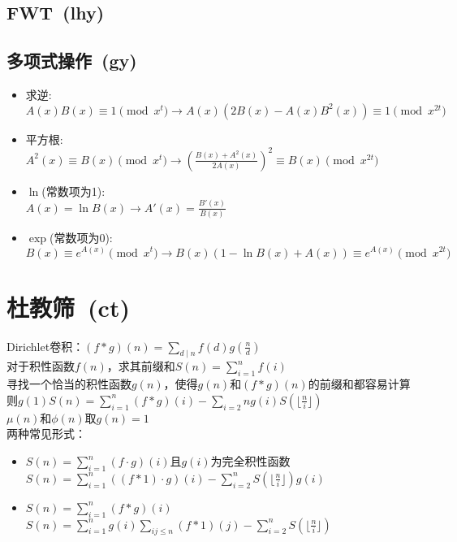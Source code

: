     \subsection*{FWT\ \small(lhy)}
    \subsection*{多项式操作\ \small(gy)}
        \begin{itemize}[wide=0pt]
            \item 求逆:
            \\$ A(x) B(x) \equiv 1 \pmod{x^t} \to A(x) (2B(x) - A(x) B^2(x)) \equiv 1 \pmod{x^{2t}} $
            \item 平方根:
            \\$ A^2(x) \equiv B(x) \pmod{x^t} \to (\frac{B(x) + A^2(x)}{2A(x)})^2 \equiv B(x) \pmod{x^{2t}} $
            \item $ \ln $(常数项为1):
            \\$ A(x) = \ln B(x) \to A'(x) = \frac{B'(x)}{B(x)} $
            \item $ \exp $(常数项为0):
            \\$ B(x) \equiv e^{A(x)} \pmod{x^t} \to B(x) (1 - \ln B(x) + A(x)) \equiv e^{A(x)} \pmod{x^{2t}} $
        \end{itemize}
\section{杜教筛\ \small(ct)}
    \noindent Dirichlet卷积：$ (f \ast g) (n) = \sum\limits_{d \mid n}^{} f(d) g(\frac{n}{d}) $
    \\对于积性函数$ f(n) $，求其前缀和$ S(n) = \sum\limits_{i = 1}^{n} f(i) $
    \\寻找一个恰当的积性函数$ g(n) $，使得$ g(n) $和$ (f \ast g) (n) $的前缀和都容易计算
    \\则$ g(1) S(n) = \sum\limits_{i = 1}^{n} (f \ast g) (i) - \sum\limits_{i = 2}{n} g(i) S(\lfloor \frac{n}{i} \rfloor) $
    \\$ \mu (n) $和$ \phi (n) $取$ g(n) = 1 $
    \\两种常见形式：
    \begin{itemize}[wide=0pt]
        \item $ S(n) = \sum\limits_{i = 1}^{n} (f \cdot g) (i) $且$ g(i) $为完全积性函数
            \\$ S(n) = \sum\limits_{i = 1}^{n} ((f \ast 1) \cdot g) (i) - \sum\limits_{i = 2}^{n} S(\lfloor \frac{n}{i} \rfloor) g(i) $
        \item $ S(n) = \sum\limits_{i = 1}^{n} (f \ast g) (i) $
            \\$ S(n) = \sum\limits_{i = 1}^{n} g (i) \sum\limits_{ij \leq n}^{} (f \ast 1) (j) - \sum\limits_{i = 2}^{n} S(\lfloor \frac{n}{i} \rfloor) $
    \end{itemize}
